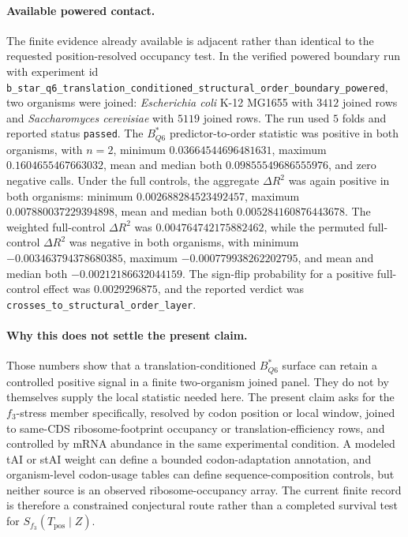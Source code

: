 \paragraph{Available powered contact.}
The finite evidence already available is adjacent rather than identical to the requested position-resolved occupancy test.  In the verified powered boundary run with experiment id \texttt{b\_star\_q6\_translation\_conditioned\_structural\_order\_boundary\_powered}, two organisms were joined: \textit{Escherichia coli} K-12 MG1655 with $3412$ joined rows and \textit{Saccharomyces cerevisiae} with $5119$ joined rows.  The run used $5$ folds and reported status \texttt{passed}.  The $B^*_{Q6}$ predictor-to-order statistic was positive in both organisms, with $n=2$, minimum $0.03664544696481631$, maximum $0.1604655467663032$, mean and median both $0.09855549686555976$, and zero negative calls.  Under the full controls, the aggregate $\Delta R^2$ was again positive in both organisms: minimum $0.002688284523492457$, maximum $0.007880037229394898$, mean and median both $0.005284160876443678$.  The weighted full-control $\Delta R^2$ was $0.004764742175882462$, while the permuted full-control $\Delta R^2$ was negative in both organisms, with minimum $-0.003463794378680385$, maximum $-0.000779938262202795$, and mean and median both $-0.00212186632044159$.  The sign-flip probability for a positive full-control effect was $0.0029296875$, and the reported verdict was \texttt{crosses\_to\_structural\_order\_layer}.

\paragraph{Why this does not settle the present claim.}
Those numbers show that a translation-conditioned $B^*_{Q6}$ surface can retain a controlled positive signal in a finite two-organism joined panel.  They do not by themselves supply the local statistic needed here.  The present claim asks for the $f_3$-stress member specifically, resolved by codon position or local window, joined to same-CDS ribosome-footprint occupancy or translation-efficiency rows, and controlled by mRNA abundance in the same experimental condition.  A modeled tAI or stAI weight can define a bounded codon-adaptation annotation, and organism-level codon-usage tables can define sequence-composition controls, but neither source is an observed ribosome-occupancy array.  The current finite record is therefore a constrained conjectural route rather than a completed survival test for $S_{f_3}(T_{\mathrm{pos}}\mid Z)$.

